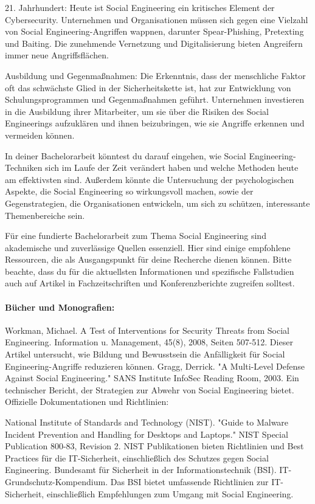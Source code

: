 21. Jahrhundert: Heute ist Social Engineering ein kritisches Element der Cybersecurity. Unternehmen und Organisationen müssen sich gegen eine Vielzahl von Social Engineering-Angriffen wappnen, darunter Spear-Phishing, Pretexting und Baiting. Die zunehmende Vernetzung und Digitalisierung bieten Angreifern immer neue Angriffsflächen.

Ausbildung und Gegenmaßnahmen: Die Erkenntnis, dass der menschliche Faktor oft das schwächste Glied in der Sicherheitskette ist, hat zur Entwicklung von Schulungsprogrammen und Gegenmaßnahmen geführt. Unternehmen investieren in die Ausbildung ihrer Mitarbeiter, um sie über die Risiken des Social Engineerings aufzuklären und ihnen beizubringen, wie sie Angriffe erkennen und vermeiden können.

In deiner Bachelorarbeit könntest du darauf eingehen, wie Social Engineering-Techniken sich im Laufe der Zeit verändert haben und welche Methoden heute am effektivsten sind. Außerdem könnte die Untersuchung der psychologischen Aspekte, die Social Engineering so wirkungsvoll machen, sowie der Gegenstrategien, die Organisationen entwickeln, um sich zu schützen, interessante Themenbereiche sein.

Für eine fundierte Bachelorarbeit zum Thema Social Engineering sind akademische und zuverlässige Quellen essenziell. Hier sind einige empfohlene Ressourcen, die als Ausgangspunkt für deine Recherche dienen können. Bitte beachte, dass du für die aktuellsten Informationen und spezifische Fallstudien auch auf Artikel in Fachzeitschriften und Konferenzberichte zugreifen solltest.

\paragraph*{Bücher und Monografien:}
Workman, Michael. A Test of Interventions for Security Threats from Social Engineering. Information u. Management, 45(8), 2008, Seiten 507-512. Dieser Artikel untersucht, wie Bildung und Bewusstsein die Anfälligkeit für Social Engineering-Angriffe reduzieren können.
Gragg, Derrick. "A Multi-Level Defense Against Social Engineering." SANS Institute InfoSec Reading Room, 2003. Ein technischer Bericht, der Strategien zur Abwehr von Social Engineering bietet.
Offizielle Dokumentationen und Richtlinien:

National Institute of Standards and Technology (NIST). "Guide to Malware Incident Prevention and Handling for Desktops and Laptops." NIST Special Publication 800-83, Revision 2. NIST Publikationen bieten Richtlinien und Best Practices für die IT-Sicherheit, einschließlich des Schutzes gegen Social Engineering.
Bundesamt für Sicherheit in der Informationstechnik (BSI). IT-Grundschutz-Kompendium. Das BSI bietet umfassende Richtlinien zur IT-Sicherheit, einschließlich Empfehlungen zum Umgang mit Social Engineering.

